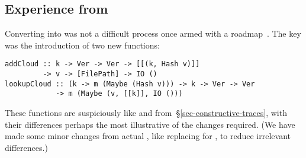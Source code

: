 

\subsection{Experience from \Cloud \Shake}\label{sec-cloud-shake}

Converting \Shake into \Cloud \Shake was not a difficult process once armed with
a roadmap~\cite{mokhov2018buildsystems}. The key was the introduction of two new
functions:

\vspace{1mm}
\begin{verbatim}
addCloud :: k -> Ver -> Ver -> [[(k, Hash v)]]
         -> v -> [FilePath] -> IO ()
lookupCloud :: (k -> m (Maybe (Hash v))) -> k -> Ver -> Ver
            -> m (Maybe (v, [[k]], IO ()))
\end{verbatim}
\vspace{1mm}

\noindent
These functions are suspiciously like  and 
from~\S\ref{sec-constructive-traces}, with their differences perhaps the most
illustrative of the changes required. (We have made some minor changes from
actual \Shake, like replacing  for , to reduce irrelevant
differences.)

